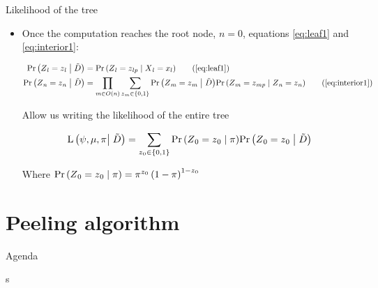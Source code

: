\documentclass[9pt,ignorenonframetext,]{beamer}
\newcommand{\Prcond}[2]{{\mbox{Pr}\left(#1\vphantom{#2}\;\right|\left.\vphantom{#1}#2\right)}}
\newcommand{\likelihood}[2]{\mbox{L}\left(#1\vphantom{#2}\right|\left.\vphantom{#1}#2\right)}
\newcommand{\aphylo}{D{}}      %
\newcommand{\aphyloObs}{\tilde \aphylo{}} %
\newcommand{\Ann}{Z{}} %
\newcommand{\ann}{z{}} %
\newcommand{\AnnObs}{X{}}
\newcommand{\annObs}{x{}}
\begin{document}
\begin{frame}[t]{Likelihood of the tree}

\begin{itemize}
\item
  Once the computation reaches the root node, \(n=0\), equations
  \eqref{eq:leaf1} and \eqref{eq:interior1}: \pause

  \tiny

  \begin{align*}
  \Prcond{\Ann_l = \ann_l}{\aphyloObs} & = \Prcond{\Ann_{l} = \ann_{lp}}{\AnnObs_{l} = \annObs_{l}} \tag{\ref{eq:leaf1}}\\
  \Prcond{\Ann_n = \ann_n}{\aphyloObs}  & = 
  \prod_{m \in O(n)} \sum_{\ann_m \in \{0,1\}} \Prcond{\Ann_m = \ann_m}{\aphyloObs}  
  \Prcond{\Ann_{m} = \ann_{mp}}{\Ann_{n} = \ann_{n}} \tag{\ref{eq:interior1}}
  \end{align*}

  \normalsize

  Allow us writing the likelihood of the entire tree

  \begin{equation}
  \label{eq:l}
  \likelihood{\psi, \mu, \pi}{\aphyloObs} = \sum_{\ann_0\in\{0,1\}}\Prcond{\Ann_0=\ann_0}{\pi}\Prcond{\Ann_0=\ann_0}{\aphyloObs}
  \end{equation}

  Where
  \(\Prcond{\Ann_0=\ann_0}{\pi} = \pi^{\ann_{0}}\left(1 - \pi\right)^{1 - \ann_{0}}\)
\end{itemize}

\end{frame}

\section{Peeling algorithm}\label{peeling-algorithm}

\begin{frame}{Agenda}

\tableofcontents[currentsection]s

\end{frame}
\end{document}
